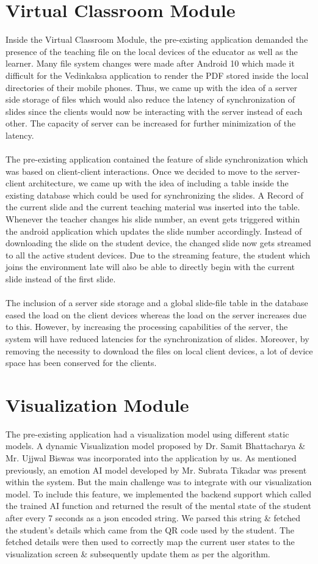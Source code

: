 \documentclass[10pt]{report}
\begin{document}
\section{Virtual Classroom Module}
Inside the Virtual Classroom Module, the pre-existing application demanded the presence of the teaching file on the local devices of the educator as well as the learner. Many file system changes were made after Android 10 which made it difficult for the Vedinkaksa application to render the PDF stored inside the local directories of their mobile phones. Thus, we came up with the idea of a server side storage of files which would also reduce the latency of synchronization of slides since the clients would now be interacting with the server instead of each other. The capacity of server can be increased for further minimization of the latency. \\ \\
The pre-existing application contained the feature of slide synchronization which was based on client-client interactions. Once we decided to move to the server-client architecture, we came up with the idea of including a table inside the existing database which could be used for synchronizing the slides. A Record of the current slide and the current teaching material was inserted into the table. Whenever the teacher changes his slide number, an event gets triggered within the android application which updates the slide number accordingly. Instead of downloading the slide on the student device, the changed slide now gets streamed to all the active student devices. Due to the streaming feature, the student which joins the environment late will also be able to directly begin with the current slide instead of the first slide. \\ \\ 
The inclusion of a server side storage and a global slide-file table in the database eased the load on the client devices whereas the load on the server increases due to this. However, by increasing the processing capabilities of the server, the system will have reduced latencies for the synchronization of slides. Moreover, by removing the necessity to download the files on local client devices, a lot of device space has been conserved for the clients.          
\section{Visualization Module}
The pre-existing application had a visualization model using different static models. A dynamic Visualization model proposed by Dr. Samit Bhattacharya \& Mr. Ujjwal Biswas was incorporated into the application by us. As mentioned previously, an emotion AI model developed by Mr. Subrata Tikadar was present within the system. But the main challenge was to integrate with our visualization model. To include this feature, we implemented the backend support which called the trained AI function and returned the result of the mental state of the student after every 7 seconds as a json encoded string. We parsed this string \& fetched the student's details which came from the QR code used by the student. The fetched details were then used to correctly map the current user states to the visualization screen \& subsequently update them as per the algorithm.
\end{document}
